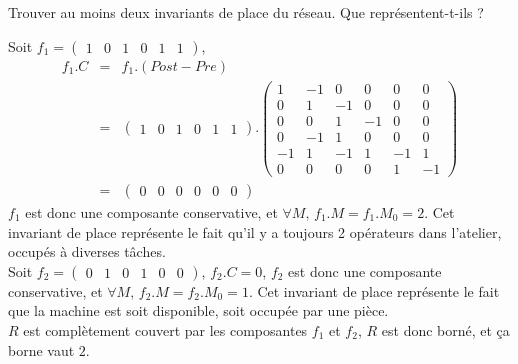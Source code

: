 \documentclass[a4paper]{article}
\begin{document}
\begin{questions}
\question Trouver au moins deux invariants de place du réseau. Que représentent-t-ils ? 

\begin{correction}{.8}
Soit $f_1 = \begin{pmatrix} 1 & 0 & 1 & 0 & 1 & 1\end{pmatrix}$,
\begin{eqnarray*}
f_1 . C &=& f_1 . (Post - Pre)\\
	&=& \begin{pmatrix} 1 & 0 & 1 & 0 & 1 & 1\end{pmatrix} . \begin{pmatrix}
		1 & -1 & 0 & 0 & 0 & 0 \\ %
		0 & 1 & -1 & 0 & 0 & 0 \\ %
		0 & 0 & 1 & -1 & 0 & 0 \\ %
		0 & -1 & 1 & 0 & 0 & 0 \\ %
		-1 & 1 & -1 & 1 & -1 & 1 \\ %
		0 & 0 & 0 & 0 & 1 & -1    %
		\end{pmatrix}\\
	&=& \begin{pmatrix} 0 & 0 & 0 & 0 & 0 & 0\end{pmatrix}
\end{eqnarray*}
$f_1$ est donc une composante conservative, et $\forall M, \, f_1 . M = f_1 . M_0 = 2$.
Cet invariant de place représente le fait qu'il y a toujours 2 opérateurs dans l'atelier, occupés à diverses tâches.\\

Soit $f_2 = \begin{pmatrix}0 & 1 & 0 & 1 & 0 & 0\end{pmatrix}$, $f_2 . C = 0 $, $f_2$ est donc une 
composante conservative, et $\forall M, \, f_2 . M = f_2 . M_0 = 1$.
Cet invariant de place représente le fait que la machine est soit disponible, soit occupée par une pièce.\\

$R$ est complètement couvert par les composantes $f_1$ et $f_2$, $R$ est donc borné, et ça borne vaut $2$.
\end{correction}

\end{questions}


\end{document}
